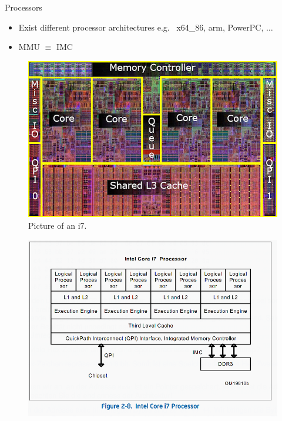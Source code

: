 \documentclass[10pt]{beamer}
\begin{document}
\begin{frame}[allowframebreaks]{Processors}
\begin{itemize}
 \item 
Exist different processor architectures e.g. \ x64\_86, arm, PowerPC, $\dots$ \\
\item MMU $\equiv$ IMC
\end{itemize}
\begin{figure}
       \begin{center}
       \includegraphics[keepaspectratio, width=\textwidth,height=0.6\textheight-4\baselineskip]{img/203_Cpu-diagram.jpg}
      \end{center}
      \caption{Picture of an i7.~\autocite{crate}}
      \end{figure}
\framebreak
      \begin{figure}
       \begin{center}
       \includegraphics[keepaspectratio, width=\textwidth,height=0.8\textheight-4\baselineskip]{img/203_i7.png}

\end{center}
\end{figure}
\end{frame}
\end{document}
